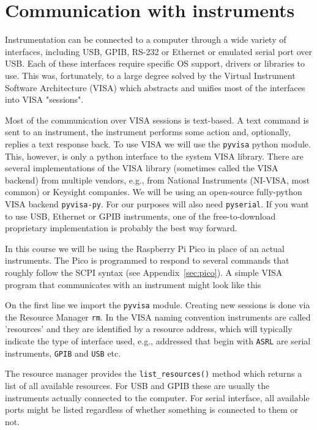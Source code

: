 \documentclass{article}
\newcounter{syntax}
\begin{document}
\newpage
\section{Communication with instruments}
Instrumentation can be connected to a computer through a wide variety of interfaces, including USB, GPIB, RS-232 or Ethernet or emulated serial port over USB. Each of these interfaces require specific OS support, drivers or libraries to use. This was, fortunately, to a large degree solved by the Virtual Instrument Software Architecture (VISA) which abstracts and unifies most of the interfaces into VISA "sessions".

Most of the communication over VISA sessions is text-based. A text command is sent to an instrument, the instrument performs some action and, optionally, replies a text response back. To use VISA we will use the \lstinline|pyvisa| python module. This, however, is only a python interface to the system VISA library. There are several implementations of the VISA library (sometimes called the VISA backend) from multiple vendors, e.g., from National Instruments (NI-VISA, most common) or Keysight companies. We will be using an open-source fully-python VISA backend \lstinline|pyvisa-py|. For our purposes will also need \lstinline|pyserial|. If you want to use USB, Ethernet or GPIB instruments, one of the free-to-download proprietary implementation is probably the best way forward.

In this course we will be using the Raspberry Pi Pico in place of an actual instruments. The Pico is programmed to respond to several commands that roughly follow the SCPI syntax (see Appendix~\ref{sec:pico}). A simple VISA program that communicates with an instrument might look like this

On the first line we import the \lstinline|pyvisa| module. Creating new sessions is done via the Resource Manager \lstinline|rm|. In the VISA naming convention instruments are called 'resources' and they are identified by a resource address, which will typically indicate the type of interface used, e.g., addressed that begin with \lstinline|ASRL| are serial instruments, \lstinline|GPIB| and \lstinline|USB| etc.

The resource manager provides the \lstinline|list_resources()| method which returns a list of all available resources. For USB and GPIB these are usually the instruments actually connected to the computer. For serial interface, all available ports might be listed regardless of whether something is connected to them or not.
\end{document}
